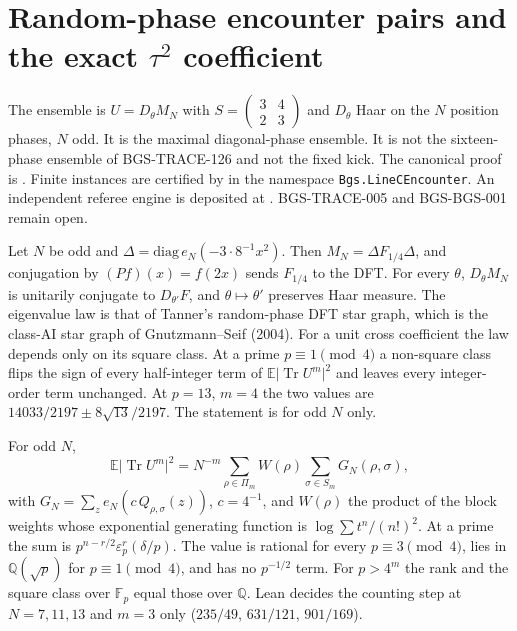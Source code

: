 \section{Random-phase encounter pairs and the exact $\tau^2$ coefficient}
\label{sec:random-phase-encounter}
The ensemble is $U=D_\theta M_N$ with $S=\begin{pmatrix}3&4\\2&3\end{pmatrix}$ and $D_\theta$ Haar on the $N$ position phases, $N$ odd. It is the maximal diagonal-phase ensemble. It is not the sixteen-phase ensemble of BGS-TRACE-126 and not the fixed kick. The canonical proof is
.
Finite instances are certified by
in the namespace \texttt{Bgs.LineCEncounter}.
An independent referee engine is deposited at
.
BGS-TRACE-005 and BGS-BGS-001 remain open.

\begin{theorem}
\label{thm:linec-dft}
Let $N$ be odd and $\Delta=\mathrm{diag}\,e_N(-3\cdot 8^{-1}x^2)$. Then $M_N=\Delta F_{1/4}\Delta$, and conjugation by $(Pf)(x)=f(2x)$ sends $F_{1/4}$ to the DFT. For every $\theta$, $D_\theta M_N$ is unitarily conjugate to $D_{\theta'}F$, and $\theta\mapsto\theta'$ preserves Haar measure. The eigenvalue law is that of Tanner's random-phase DFT star graph, which is the class-AI star graph of Gnutzmann--Seif (2004). For a unit cross coefficient the law depends only on its square class. At a prime $p\equiv 1\pmod 4$ a non-square class flips the sign of every half-integer term of $\mathbb E\lvert\operatorname{Tr} U^m\rvert^2$ and leaves every integer-order term unchanged. At $p=13$, $m=4$ the two values are $14033/2197\pm 8\sqrt{13}/2197$. The statement is for odd $N$ only.
\end{theorem}

\begin{theorem}
\label{thm:linec-gauss}
For odd $N$,
\[
\mathbb E\lvert\operatorname{Tr} U^m\rvert^2
=N^{-m}\sum_{\rho\in\Pi_m}W(\rho)\sum_{\sigma\in S_m}G_N(\rho,\sigma),
\]
with $G_N=\sum_z e_N(c\,Q_{\rho,\sigma}(z))$, $c=4^{-1}$, and $W(\rho)$ the product of the block weights whose exponential generating function is $\log\sum t^n/(n!)^2$. At a prime the sum is $p^{n-r/2}\varepsilon_p^r(\delta/p)$. The value is rational for every $p\equiv 3\pmod 4$, lies in $\mathbb Q(\sqrt p)$ for $p\equiv 1\pmod 4$, and has no $p^{-1/2}$ term. For $p>4^m$ the rank and the square class over $\mathbb F_p$ equal those over $\mathbb Q$. Lean decides the counting step at $N=7,11,13$ and $m=3$ only ($235/49$, $631/121$, $901/169$).
\end{theorem}

